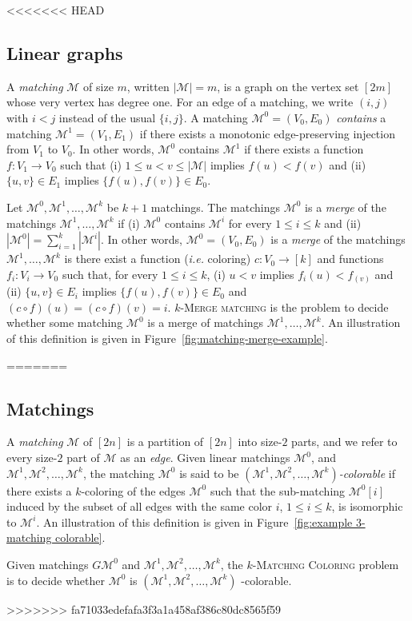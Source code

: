 <<<<<<< HEAD
\subsection*{\textbf{Linear graphs}}

A \emph{matching} $\mathcal{M}$ of size $m$, written $|\mathcal{M}| = m$, 
is a graph on the vertex set $[2m]$ whose very vertex has degree one.
For an edge of a matching, we write $(i, j)$ with $i < j$ instead of the usual $\{i, j\}$.
A matching $\mathcal{M}^0 = (V_0, E_0)$ \emph{contains} a matching 
$\mathcal{M}^1 = (V_1, E_1)$ if there exists a monotonic edge-preserving injection from $V_1$ to $V_0$.
In other words, $\mathcal{M}^0$ contains $\mathcal{M}^1$ if there exists a function 
$f : V_1 \to V_0$ such that 
(i) $1 \leq u < v \leq |\mathcal{M}|$ implies $f(u) < f(v)$ and  
(ii) $\{u, v\} \in E_1$ implies $\{f(u), f(v)\} \in E_0$.

Let $\mathcal{M}^0, \mathcal{M}^1, \dots, \mathcal{M}^k$ be $k+1$ matchings.
The matchings $\mathcal{M}^0$ is a \emph{merge} of the matchings 
$\mathcal{M}^1, \dots, \mathcal{M}^k$ 
if 
(i) $\mathcal{M}^0$ contains $\mathcal{M}^i$ for every $1 \leq i \leq k$ 
and (ii) $\left|\mathcal{M}^0\right| = \sum_{i=1}^{k} \left|\mathcal{M}^i\right|$.
In other words,  $\mathcal{M}^0 = (V_0, E_0)$ is a \emph{merge} of the matchings 
$\mathcal{M}^1, \dots, \mathcal{M}^k$ is there exist a function (\emph{i.e.} coloring)
$c : V_0 \to [k]$  and functions $f_i : V_i \to V_0$ such that, for every $1 \leq i \leq k$,
(i) $u < v$ implies $f_i(u) < f_(v)$ and  
(ii) $\{u, v\} \in E_i$ implies $\{f(u), f(v)\} \in E_0$ and $(c \circ f)(u) = (c \circ f)(v) = i$.
\textsc{$k$-Merge matching} is the problem to decide whether some matching 
$\mathcal{M}^0$ is a merge of matchings $\mathcal{M}^1, \dots, \mathcal{M}^k$.
An illustration of this definition is given in Figure~\ref{fig:matching-merge-example}.


=======
\subsection*{\textbf{Matchings}}

A \emph{matching} $\mathcal{M}$ of $[2n]$ is a partition of $[2n]$ into size-$2$ parts,
and we refer to every size-$2$ part of $\mathcal{M}$ as an \emph{edge}.
Given linear matchings $\mathcal{M}^0$, and $\mathcal{M}^1, \mathcal{M}^2, \dots, \mathcal{M}^k$,
the matching $\mathcal{M}^0$ is said to be
\emph{$(\mathcal{M}^1, \mathcal{M}^2, \ldots, \mathcal{M}^k)$-colorable}
if there exists a $k$-coloring of the edges $\mathcal{M}^0$ such that
the sub-matching $\mathcal{M}^0[i]$ induced by the subset of all edges with the
same color $i$, $1 \leq i \leq k$, is isomorphic to $\mathcal{M}^i$.
An illustration of this definition is given in
Figure~\ref{fig:example 3-matching colorable}.

Given matchings $G\mathcal{M}^0$ and $\mathcal{M}^1, \mathcal{M}^2, \ldots, \mathcal{M}^k$,
the \textsc{$k$-Matching Coloring} problem is to decide whether $\mathcal{M}^0$
is $(\mathcal{M}^1, \mathcal{M}^2, \ldots, \mathcal{M}^k)$ -colorable.



>>>>>>> fa71033edefafa3f3a1a458af386c80dc8565f59
